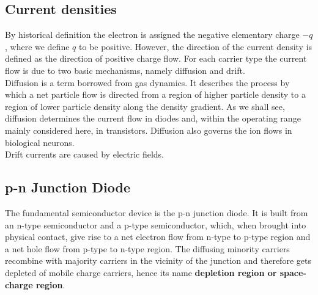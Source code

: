 \documentclass[main]{subfiles}
\begin{document}
\subsection{Current densities}
By historical definition the electron is assigned the negative elementary charge \(-q\) , where we define \(q\) to be positive. However, the direction of the current density is
defined as the direction of positive charge flow. For each carrier type the current flow is due to two basic mechanisms, namely diffusion and drift.\\
Diffusion is a term borrowed from gas dynamics. It describes the process by which a net particle flow is directed from a region of
higher particle density to a region of lower particle density along the density gradient. As we shall see, diffusion determines the current flow in diodes and, within the operating range mainly considered here, in transistors.
Diffusion also governs the ion flows in biological neurons.\\
Drift currents are caused by electric fields.

\subsection{p-n Junction Diode}
The fundamental semiconductor device is the p-n junction diode. It is built from an n-type semiconductor and a p-type semiconductor, which, when brought into physical contact, give rise to a net electron flow from n-type to p-type region and a net hole flow from p-type to n-type region. The diffusing minority carriers recombine with majority carriers in the vicinity of the junction and therefore gets depleted of mobile charge carriers, hence its name \textbf{depletion region or space-charge region}. 
\end{document}
